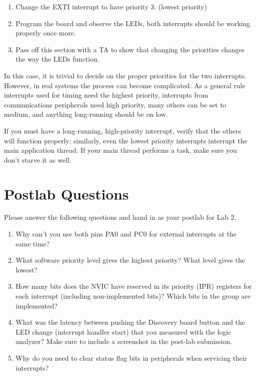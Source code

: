 \documentclass[openany,11pt,fleqn]{book} %
\begin{document}
\begin{assignment}
    \begin{enumerate}
        \item Change the EXTI interrupt to have priority 3. (lowest priority)
        \item Program the board and observe the LEDs, both interrupts should be working properly once more.
        \item Pass off this section with a TA to show that changing the priorities changes the way the LEDs function.
    \end{enumerate}
    
    In this case, it is trivial to decide on the proper priorities for the two interrupts. However, in real systems the process can become complicated. As a general rule interrupts used for timing need the highest priority, interrupts from communications peripherals need high priority, many others can be set to medium, and anything long-running should be on low. 
    
    If you must have a long-running, high-priority interrupt, verify that the others will function properly; similarly, even the lowest priority interrupts interrupt the main application thread. If your main thread performs a task, make sure you don't starve it as well.
    
\end{assignment}

\section{\color{blue}Postlab Questions}
\begin{question}[Postlab 2]
	Please answer the following questions and hand in as your postlab for Lab 2.
	\begin{enumerate}
		\item Why can't you use both pins PA0 and PC0 for external interrupts at the same time?
		\item What software priority level gives the highest priority? What level gives the lowest?
		\item How many bits does the NVIC have reserved in its priority (IPR) registers for each interrupt (including non-implemented bits)?
		Which bits in the group are implemented?
		\item What was the latency between pushing the Discovery board button and the LED change (interrupt handler start) that you measured with the logic analyzer?
		Make sure to include a screenshot in the post-lab submission.
		\item Why do you need to clear status flag bits in peripherals when servicing their interrupts?
	\end{enumerate}
\end{question}
\end{document}
